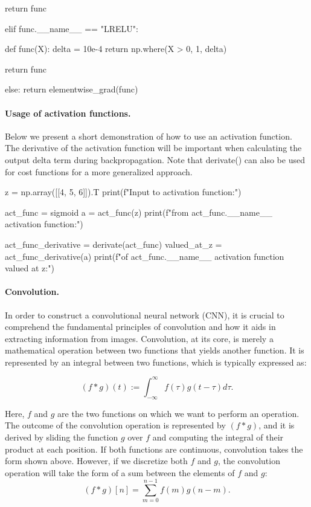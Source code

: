 \documentclass[%
oneside,                 %
final,                   %
10pt]{article}
\begin{document}
        return func

    elif func.__name__ == "LRELU":

        def func(X):
            delta = 10e-4
            return np.where(X > 0, 1, delta)

        return func

    else:
        return elementwise_grad(func)

\epycod


\paragraph{Usage of activation functions.}
Below we present a short demonstration of how to use an activation
function. The derivative of the activation function will be important
when calculating the output delta term during backpropagation. Note
that derivate() can also be used for cost functions for a more
generalized approach.












\bpycod
z = np.array([[4, 5, 6]]).T
print(f"Input to activation function:")

act_func = sigmoid
a = act_func(z)
print(f"\nOutput from {act_func.__name__} activation function:")

act_func_derivative = derivate(act_func)
valued_at_z = act_func_derivative(a)
print(f"\nDerivative of {act_func.__name__} activation function valued at z:")

\epycod


\paragraph{Convolution.}
In order to construct a convolutional neural network (CNN), it is
crucial to comprehend the fundamental principles of convolution and
how it aids in extracting information from images. Convolution, at its
core, is merely a mathematical operation between two functions that
yields another function. It is represented by an integral between two
functions, which is typically expressed as:

\[
(f \ast g)(t):=\int_{-\infty}^{\infty} f(\tau) g(t-\tau) d \tau.
\]

Here, $f$ and $g$ are the two functions on which we want to perform an
operation. The outcome of the convolution operation is represented by
$(f \ast g)$, and it is derived by sliding the function $g$ over $f$ and
computing the integral of their product at each position. If both
functions are continuous, convolution takes the form shown
above. However, if we discretize both $f$ and $g$, the convolution
operation will take the form of a sum between the elements of $f$ and $g$:
\[
(f \ast g)[n]=\sum_{m=0}^{n-1} f(m) g(n-m).
\]
\end{document}
